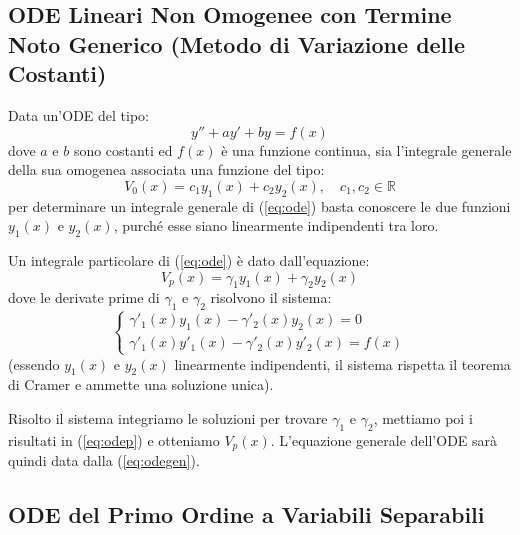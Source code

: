 \documentclass[a4paper,11pt]{article}
\begin{document}
\subsection[Metodo di Variazione delle Costanti]{ODE Lineari Non Omogenee con Termine Noto Generico (Metodo di Variazione delle Costanti)}
Data un'ODE del tipo:
\begin{equation}\label{eq:ode}
    y'' + ay' + by = f(x)
\end{equation}
dove $a$ e $b$ sono costanti ed $f(x)$ è una funzione continua, sia l'integrale generale della sua omogenea associata una funzione del tipo:
\begin{equation*}
    V_0(x) = c_1y_1(x) + c_2y_2(x), \quad c_1, c_2 \in \mathbb{R}
\end{equation*}
per determinare un integrale generale di (\ref{eq:ode}) basta conoscere le due funzioni $y_1(x)$ e $y_2(x)$, purché esse siano linearmente indipendenti tra loro.

Un integrale particolare di (\ref{eq:ode}) è dato dall'equazione:
\begin{equation}\label{eq:odep}
    V_p(x) = \gamma_1y_1(x) + \gamma_2y_2(x)
\end{equation}
dove le derivate prime di $\gamma_1$ e $\gamma_2$ risolvono il sistema:
\begin{equation*}
    \begin{cases}
        \gamma'_1(x)y_1(x) - \gamma'_2(x)y_2(x) = 0 \\
        \gamma'_1(x)y'_1(x) - \gamma'_2(x)y'_2(x) = f(x)
    \end{cases}
\end{equation*}
(essendo $y_1(x)$ e $y_2(x)$ linearmente indipendenti, il sistema rispetta il teorema di Cramer e ammette una soluzione unica).

Risolto il sistema integriamo le soluzioni per trovare $\gamma_1$ e $\gamma_2$, mettiamo poi i risultati in (\ref{eq:odep}) e otteniamo $V_p(x)$.
L'equazione generale dell'ODE sarà quindi data dalla (\ref{eq:odegen}).

\subsection[Equazioni a Variabili Separabili]{ODE del Primo Ordine a Variabili Separabili}
\end{document}
